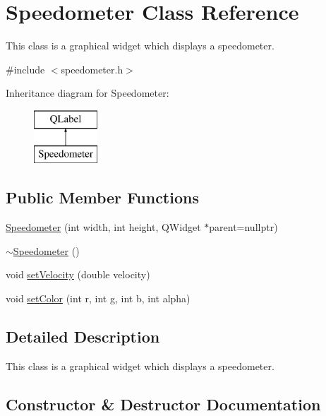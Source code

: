 \hypertarget{class_speedometer}{}\section{Speedometer Class Reference}
\label{class_speedometer}


This class is a graphical widget which displays a speedometer.  




{\ttfamily \#include $<$speedometer.\+h$>$}

Inheritance diagram for Speedometer\+:\begin{figure}[H]
\begin{center}
\leavevmode
\includegraphics[height=2.000000cm]{class_speedometer}
\end{center}
\end{figure}
\subsection*{Public Member Functions}
\begin{DoxyCompactItemize}
\item 
\mbox{\hyperlink{class_speedometer_ac12c1bd9f872c56e76baf864b2c8ae9e}{Speedometer}} (int width, int height, Q\+Widget $\ast$parent=nullptr)
\item 
\mbox{\hyperlink{class_speedometer_aba22e8543b09ffeec4be5e904e9507f0}{$\sim$\+Speedometer}} ()
\item 
void \mbox{\hyperlink{class_speedometer_ad52da130f27de310b251caea15590f7f}{set\+Velocity}} (double velocity)
\item 
void \mbox{\hyperlink{class_speedometer_a50fc8806fbc8f42b2550004d63df1e95}{set\+Color}} (int r, int g, int b, int alpha)
\end{DoxyCompactItemize}


\subsection{Detailed Description}
This class is a graphical widget which displays a speedometer. 

\subsection{Constructor \& Destructor Documentation}
\mbox{\label{class_speedometer_ac12c1bd9f872c56e76baf864b2c8ae9e}} 
